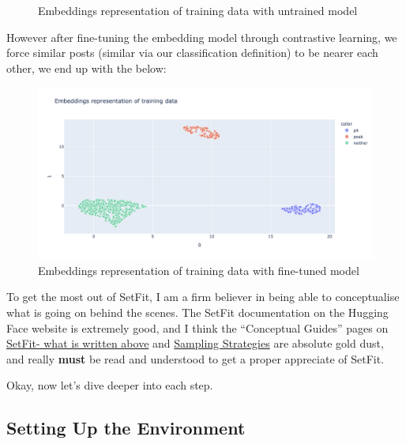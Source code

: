 \documentclass[
  letterpaper,
  DIV=11,
  numbers=noendperiod]{scrreprt}
\begin{document}
\begin{tcolorbox}
\begin{figure}[H]
{}

\caption{Embeddings representation of training data with untrained
model}

\end{figure}%

However after fine-tuning the embedding model through contrastive
learning, we force similar posts (similar via our classification
definition) to be nearer each other, we end up with the below:

\begin{figure}[H]

{\centering \includegraphics{quarto_docs/../img/setfit_tuned.png}

}

\caption{Embeddings representation of training data with fine-tuned
model}

\end{figure}%

\end{tcolorbox}

To get the most out of SetFit, I am a firm believer in being able to
conceptualise what is going on behind the scenes. The SetFit
documentation on the Hugging Face website is extremely good, and I think
the ``Conceptual Guides'' pages on
\href{https://huggingface.co/docs/setfit/en/conceptual_guides/setfit}{SetFit-
what is written above} and
\href{https://huggingface.co/docs/setfit/en/conceptual_guides/sampling_strategies}{Sampling
Strategies} are absolute gold dust, and really \textbf{must} be read and
understood to get a proper appreciate of SetFit.

Okay, now let's dive deeper into each step.

\subsection{Setting Up the
Environment}\label{setting-up-the-environment}
\end{document}

